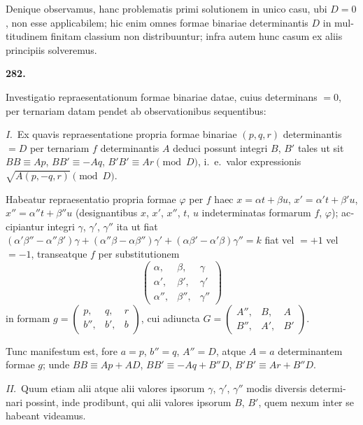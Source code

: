\documentclass[12pt,a4paper]{article}
\theoremstyle{plain}
\theoremstyle{definition}
\theoremstyle{remark}
\begin{document}
\begin{otherlanguage}{latin}
Denique observamus, hanc problematis primi solutionem in unico casu, ubi $D = 0$, non esse applicabilem; hic enim omnes formae binariae determinantis $D$ in multitudinem finitam classium non distribuuntur; infra autem hunc casum ex aliis principiis solveremus.

\end{otherlanguage}

\begin{otherlanguage}{latin}

\textbf{282.}

Investigatio repraesentationum formae binariae datae, cuius determinans $= 0$, per ternariam datam pendet ab observationibus sequentibus:

\textit{I.}\ Ex quavis repraesentatione propria formae binariae $(p, q, r)$ determinantis $= D$ per ternariam $f$ determinantis $A$ deduci possunt integri $B$, $B'$ tales ut sit $BB \equiv Ap$, $BB' \equiv -Aq$, $B'B' \equiv Ar \pmod{D}$, i.\ e.\ valor expressionis $\sqrt{A(p, -q, r)} \pmod{D}$.

Habeatur repraesentatio propria formae $\varphi$ per $f$ haec $x = \alpha t + \beta u$, $x' = \alpha' t + \beta' u$, $x'' = \alpha'' t + \beta'' u$ (designantibus $x$, $x'$, $x''$, $t$, $u$ indeterminatas formarum $f$, $\varphi$); accipiantur integri $\gamma$, $\gamma'$, $\gamma''$ ita ut fiat $(\alpha'\beta'' - \alpha''\beta')\gamma + (\alpha''\beta - \alpha\beta'')\gamma' + (\alpha\beta' - \alpha'\beta)\gamma'' = k$ fiat vel $= +1$ vel $= -1$, transeatque $f$ per substitutionem
\[
\begin{pmatrix} \alpha, & \beta, & \gamma \\ \alpha', & \beta', & \gamma' \\ \alpha'', & \beta'', & \gamma'' \end{pmatrix}
\]
in formam $g = \begin{pmatrix} p, & q, & r \\ b'', & b', & b \end{pmatrix}$, cui adiuncta $G = \begin{pmatrix} A'', & B, & A \\ B'', & A', & B' \end{pmatrix}$.

Tunc manifestum est, fore $a = p$, $b'' = q$, $A'' = D$, atque $A = a$ determinantem formae $g$; unde $BB \equiv Ap + AD$, $BB' \equiv -Aq + B''D$, $B'B' \equiv Ar + B''D$.

\textit{II.}\ Quum etiam alii atque alii valores ipsorum $\gamma$, $\gamma'$, $\gamma''$ modis diversis determinari possint, inde prodibunt, qui alii valores ipsorum $B$, $B'$, quem nexum inter se habeant videamus.


\end{otherlanguage}
\end{document}
